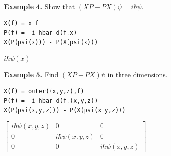 \bigskip
{\bf Example 4.} Show that $(XP-PX)\psi=i\hbar\psi$.
{\color{blue}
\begin{verbatim}
X(f) = x f
P(f) = -i hbar d(f,x)
X(P(psi(x))) - P(X(psi(x)))
\end{verbatim}}
$i\hbar\psi(x)$

\bigskip
{\bf Example 5.} Find $(XP-PX)\psi$ in three dimensions.
{\color{blue}
\begin{verbatim}
X(f) = outer((x,y,z),f)
P(f) = -i hbar d(f,(x,y,z))
X(P(psi(x,y,z))) - P(X(psi(x,y,z)))
\end{verbatim}}
$\begin{bmatrix}
i\hbar\psi(x,y,z) & 0 & 0
\\[1ex]
0 & i\hbar\psi(x,y,z) & 0
\\[1ex]
0 & 0 & i\hbar\psi(x,y,z)
\end{bmatrix}
$


